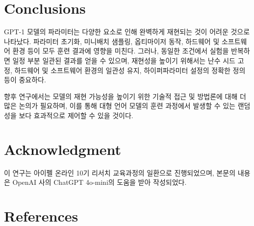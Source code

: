 \documentclass[conference]{IEEEtran}
\begin{document}
\section{Conclusions}

GPT-1 모델의 파라미터는 다양한 요소로 인해 완벽하게 재현되는 것이 어려운 것으로 나타났다. 파라미터 초기화, 미니배치 샘플링, 옵티마이저 동작, 하드웨어 및 소프트웨어 환경 등이 모두 훈련 결과에 영향을 미친다. 그러나, 동일한 조건에서 실험을 반복하면 일정 부분 일관된 결과를 얻을 수 있으며, 재현성을 높이기 위해서는 난수 시드 고정, 하드웨어 및 소프트웨어 환경의 일관성 유지, 하이퍼파라미터 설정의 정확한 정의 등이 중요하다.

향후 연구에서는 모델의 재현 가능성을 높이기 위한 기술적 접근 및 방법론에 대해 더 많은 논의가 필요하며, 이를 통해 대형 언어 모델의 훈련 과정에서 발생할 수 있는 랜덤성을 보다 효과적으로 제어할 수 있을 것이다.

\section*{Acknowledgment}

이 연구는 아이펠 온라인 10기 리서치 교육과정의 일환으로 진행되었으며, 본문의 내용은 OpenAI 사의 ChatGPT 4o-mini의 도움을 받아 작성되었다.

\section*{References}



\end{document}
